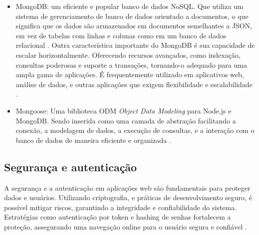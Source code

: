 \begin{itemize}
    \item MongoDB: um eficiente e popular banco de dados NoSQL. Que utiliza um sistema de gerenciamento de banco de dados orientado a documentos, o que significa que os dados são armazenados em documentos semelhantes a JSON, em vez de tabelas com linhas e colunas como em um banco de dados relacional \cite{pereira2014aplicações}.
    Outra característica importante do MongoDB é sua capacidade de escalar horizontalmente. Oferecendo recursos avançados, como indexação, consultas poderosas e suporte a transações, tornando-o adequado para uma ampla gama de aplicações. É frequentemente utilizado em aplicativos web, análise de dados, e outras aplicações que exigem flexibilidade e escalabilidade \cite{pereira2014aplicações}.
    \item Mongoose:  Uma biblioteca ODM \textit{Object Data Modeling} para Node.js e MongoDB. Sendo inserida como uma camada de abstração facilitando a conexão, a modelagem de dados, a execução de consultas, e a interação com o banco de dados de maneira eficiente e organizada \cite{pereira2014aplicações}.

\end{itemize}




\subsection{Segurança e autenticação}
A segurança e a autenticação em aplicações web são fundamentais para proteger dados e usuários. Utilizando criptografia,  e práticas de desenvolvimento seguro, é possível mitigar riscos, garantindo a integridade e confiabilidade do sistema. Estratégias como autenticação por token e hashing de senhas fortalecem a proteção, assegurando uma navegação online para o usuário segura e confiável \cite{segurancaeauth}.

